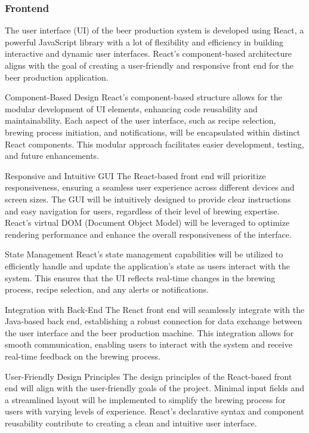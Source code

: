 \subsubsection{Frontend}
The user interface (UI) of the beer production system is developed using React, a powerful JavaScript library with a lot of flexibility and efficiency in building interactive and dynamic user interfaces. 
React's component-based architecture aligns with the goal of creating a user-friendly and responsive front end for the beer production application.

Component-Based Design
React's component-based structure allows for the modular development of UI elements, enhancing code reusability and maintainability. Each aspect of the user interface, such as recipe selection, brewing process initiation, and notifications, will be encapsulated within distinct React components. This modular approach facilitates easier development, testing, and future enhancements.

Responsive and Intuitive GUI
The React-based front end will prioritize responsiveness, ensuring a seamless user experience across different devices and screen sizes. The GUI will be intuitively designed to provide clear instructions and easy navigation for users, regardless of their level of brewing expertise. React's virtual DOM (Document Object Model) will be leveraged to optimize rendering performance and enhance the overall responsiveness of the interface.

State Management
React's state management capabilities will be utilized to efficiently handle and update the application's state as users interact with the system. This ensures that the UI reflects real-time changes in the brewing process, recipe selection, and any alerts or notifications.

Integration with Back-End
The React front end will seamlessly integrate with the Java-based back end, establishing a robust connection for data exchange between the user interface and the beer production machine. This integration allows for smooth communication, enabling users to interact with the system and receive real-time feedback on the brewing process.

User-Friendly Design Principles
The design principles of the React-based front end will align with the user-friendly goals of the project. Minimal input fields and a streamlined layout will be implemented to simplify the brewing process for users with varying levels of experience. React's declarative syntax and component reusability contribute to creating a clean and intuitive user interface.

